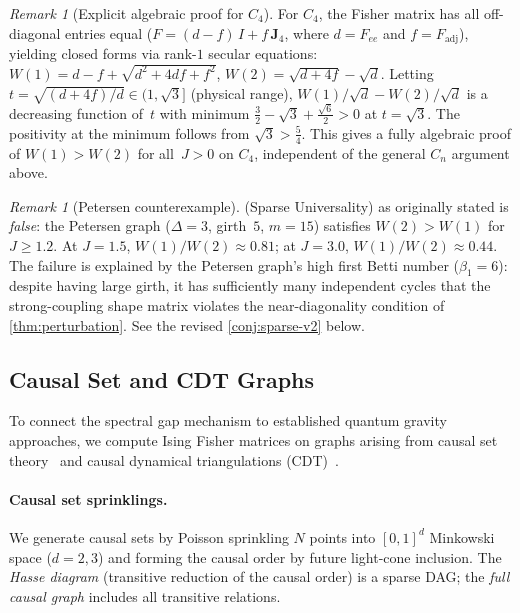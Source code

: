 \documentclass[11pt]{article}
\theoremstyle{definition}
\theoremstyle{remark}
\newtheorem{remark}[theorem]{Remark}
\begin{document}
\begin{remark}[Explicit algebraic proof for $C_4$]
\label{rem:c4-algebraic}
For $C_4$, the Fisher matrix has all off-diagonal entries equal
($F = (d{-}f)\,I + f\,\mathbf{J}_4$, where $d = F_{ee}$ and
$f = F_{\mathrm{adj}}$), yielding closed forms via rank-$1$ secular
equations:
$W(1) = d - f + \sqrt{d^2 + 4df + f^2}$,
$W(2) = \sqrt{d + 4f} - \sqrt{d}$.
Letting $t = \sqrt{(d+4f)/d} \in (1, \sqrt{3}]$ (physical range),
$W(1)/\!\sqrt{d} - W(2)/\!\sqrt{d}$ is a decreasing function of~$t$
with minimum $\tfrac{3}{2} - \sqrt{3} + \tfrac{\sqrt{6}}{2} > 0$ at
$t = \sqrt{3}$. The positivity at the minimum follows from
$\sqrt{3} > \tfrac{5}{4}$. This gives a fully algebraic proof
of $W(1) > W(2)$ for all~$J > 0$ on $C_4$, independent of the general
$C_n$ argument above.
\end{remark}

\begin{remark}[Petersen counterexample]
\label{rem:petersen}
 (Sparse Universality) as originally stated is \emph{false}:
the Petersen graph ($\Delta = 3$, girth~$5$, $m = 15$) satisfies
$W(2) > W(1)$ for $J \geq 1.2$. At $J = 1.5$, $W(1)/W(2) \approx 0.81$;
at $J = 3.0$, $W(1)/W(2) \approx 0.44$. The failure is explained by the
Petersen graph's high first Betti number ($\beta_1 = 6$): despite having
large girth, it has sufficiently many independent cycles that the
strong-coupling shape matrix violates the near-diagonality condition of
\cref{thm:perturbation}. See the revised \cref{conj:sparse-v2} below.
\end{remark}

\subsection{Causal Set and CDT Graphs}
\label{sec:causal-set}

To connect the spectral gap mechanism to established quantum gravity
approaches, we compute Ising Fisher matrices on graphs arising from causal
set theory~\cite{Bombelli1987,Sorkin1991} and causal dynamical
triangulations (CDT)~\cite{AmbjornLoll1998,AmbjornJurkiewiczLoll2004}.

\paragraph{Causal set sprinklings.}
We generate causal sets by Poisson sprinkling $N$ points into $[0,1]^d$
Minkowski space ($d = 2, 3$) and forming the causal order by future
light-cone inclusion. The \emph{Hasse diagram} (transitive reduction of the
causal order) is a sparse DAG; the \emph{full causal graph} includes all
transitive relations.
\end{document}
